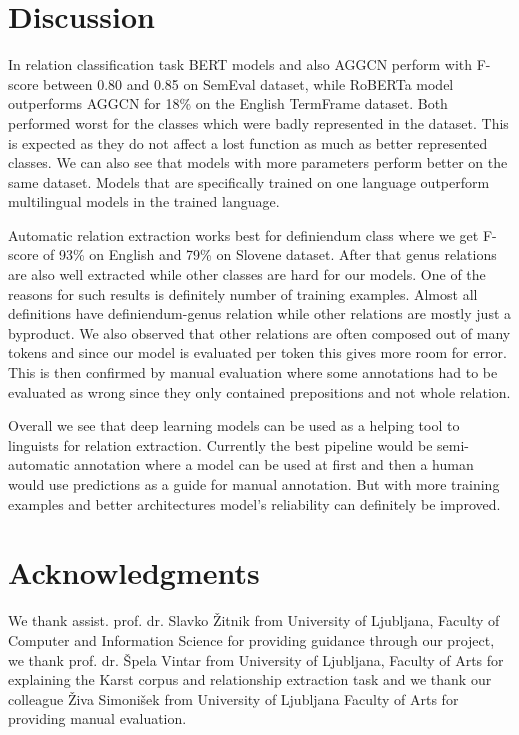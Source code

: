 \documentclass[fleqn,moreauthors,10pt]{ds_report}
\begin{document}
\section{Discussion}
\par In relation classification task BERT models and also AGGCN perform with F-score between 0.80 and 0.85 on SemEval dataset, while RoBERTa model outperforms AGGCN for 18\% on the English TermFrame dataset. Both performed worst for the classes which were badly represented in the dataset. This is expected as they do not affect a lost function as much as better represented classes. We can also see that models with more parameters perform better on the same dataset. Models that are specifically trained on one language outperform multilingual models in the trained language.   
\par Automatic relation extraction works best for definiendum class where we get F-score of 93\% on English and 79\% on Slovene dataset. After that genus relations are also well extracted while other classes are hard for our models. One of the reasons for such results is definitely number of training examples. Almost all definitions have definiendum-genus relation while other relations are mostly just a byproduct. We also observed that other relations are often composed out of many tokens and since our model is evaluated per token this gives more room for error. This is then confirmed by manual evaluation where some annotations had to be evaluated as wrong since they only contained prepositions and not whole relation.
\par Overall we see that deep learning models can be used as a helping tool to linguists for relation extraction. Currently the best pipeline would be semi-automatic annotation where a model can be used at first and then a human would use predictions as a guide for manual annotation. But with more training examples and better architectures model's reliability can definitely be improved.



\section{Acknowledgments}
We thank assist. prof. dr. Slavko Žitnik from University of Ljubljana, Faculty of Computer and Information Science for providing guidance through our project, we thank prof. dr. Špela Vintar from University of Ljubljana, Faculty of Arts for explaining the Karst corpus and relationship extraction task and we thank our colleague Živa Simonišek from University of Ljubljana Faculty of Arts for providing manual evaluation.




\end{document}
